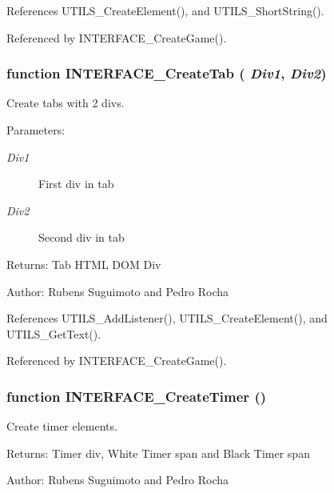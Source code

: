 References UTILS\_\-CreateElement(), and UTILS\_\-ShortString().

Referenced by INTERFACE\_\-CreateGame().
\subsubsection[INTERFACE\_\-CreateTab]{\setlength{\rightskip}{0pt plus 5cm}function INTERFACE\_\-CreateTab ( {\em Div1}, \/   {\em Div2})}\label{board_8js_77463ba04218899d75ab406ff4005a1c}


Create tabs with 2 divs. 

\begin{Desc}
\item[Parameters:]
\begin{description}
\item[{\em Div1}]First div in tab \item[{\em Div2}]Second div in tab \end{description}
\end{Desc}
\begin{Desc}
\item[Returns:]Tab HTML DOM Div \end{Desc}
\begin{Desc}
\item[Author:]Rubens Suguimoto and Pedro Rocha \end{Desc}


References UTILS\_\-AddListener(), UTILS\_\-CreateElement(), and UTILS\_\-GetText().

Referenced by INTERFACE\_\-CreateGame().
\subsubsection[INTERFACE\_\-CreateTimer]{\setlength{\rightskip}{0pt plus 5cm}function INTERFACE\_\-CreateTimer ()}\label{board_8js_7850fec263e2277c36e5dd64a9006914}


Create timer elements. 

\begin{Desc}
\item[Returns:]Timer div, White Timer span and Black Timer span \end{Desc}
\begin{Desc}
\item[Author:]Rubens Suguimoto and Pedro Rocha \end{Desc}


